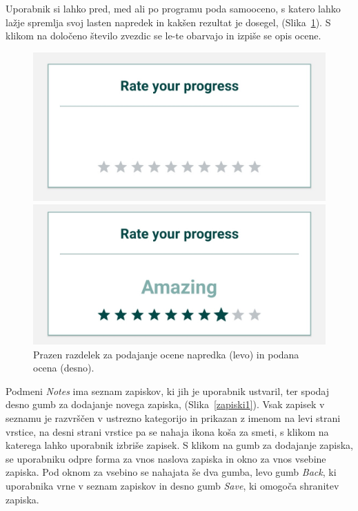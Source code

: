 \documentclass[a4paper, 12pt]{book}
\begin{document}
Uporabnik si lahko pred, med ali po programu poda samooceno, s katero lahko lažje spremlja svoj lasten napredek in kakšen rezultat je dosegel, (Slika~\ref{progress}). S klikom na določeno število zvezdic se le-te obarvajo in izpiše se opis ocene.

\begin{figure}[!ht]
\centering
  \begin{minipage}[b]{0.46\textwidth}
    \includegraphics[width=\textwidth]{emptyprogress.jpg}\centering
  \end{minipage}
  \begin{minipage}[b]{0.49\textwidth}
    \includegraphics[width=\textwidth]{fullprogress.jpg}\centering
  \end{minipage}
    \caption{Prazen razdelek za podajanje ocene napredka (levo) in podana ocena (desno).}
    \label{progress}
\end{figure}

Podmeni \textit{Notes} ima seznam zapiskov, ki jih je uporabnik ustvaril, ter spodaj desno gumb za dodajanje novega zapiska, (Slika~\ref{zapiski1}). Vsak zapisek v seznamu je razvrščen v ustrezno kategorijo in prikazan z imenom na levi strani vrstice, na desni strani vrstice pa se nahaja ikona koša za smeti, s klikom na katerega lahko uporabnik izbriše zapisek. S klikom na gumb za dodajanje zapiska, se uporabniku odpre forma za vnos naslova zapiska in okno za vnos vsebine zapiska. Pod oknom za vsebino se nahajata še dva gumba, levo gumb \textit{Back}, ki uporabnika vrne v seznam zapiskov in desno gumb \textit{Save}, ki omogoča shranitev zapiska.
\end{document}
